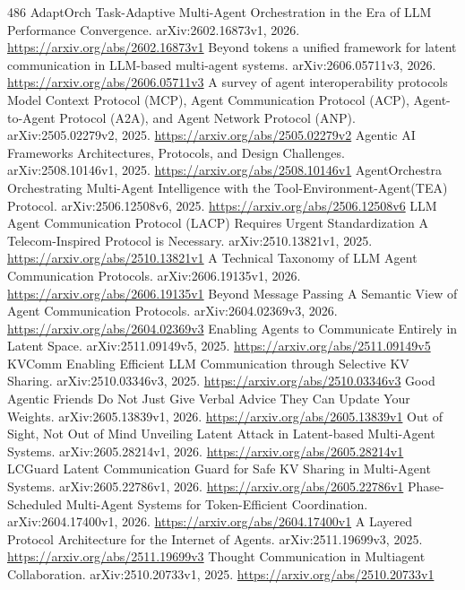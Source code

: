 \documentclass[11pt]{article}
\begin{document}
\begin{thebibliography}{486}
 AdaptOrch Task-Adaptive Multi-Agent Orchestration in the Era of LLM Performance Convergence. arXiv:2602.16873v1, 2026. \url{https://arxiv.org/abs/2602.16873v1}
 Beyond tokens a unified framework for latent communication in LLM-based multi-agent systems. arXiv:2606.05711v3, 2026. \url{https://arxiv.org/abs/2606.05711v3}
 A survey of agent interoperability protocols Model Context Protocol (MCP), Agent Communication Protocol (ACP), Agent-to-Agent Protocol (A2A), and Agent Network Protocol (ANP). arXiv:2505.02279v2, 2025. \url{https://arxiv.org/abs/2505.02279v2}
 Agentic AI Frameworks Architectures, Protocols, and Design Challenges. arXiv:2508.10146v1, 2025. \url{https://arxiv.org/abs/2508.10146v1}
 AgentOrchestra Orchestrating Multi-Agent Intelligence with the Tool-Environment-Agent(TEA) Protocol. arXiv:2506.12508v6, 2025. \url{https://arxiv.org/abs/2506.12508v6}
 LLM Agent Communication Protocol (LACP) Requires Urgent Standardization A Telecom-Inspired Protocol is Necessary. arXiv:2510.13821v1, 2025. \url{https://arxiv.org/abs/2510.13821v1}
 A Technical Taxonomy of LLM Agent Communication Protocols. arXiv:2606.19135v1, 2026. \url{https://arxiv.org/abs/2606.19135v1}
 Beyond Message Passing A Semantic View of Agent Communication Protocols. arXiv:2604.02369v3, 2026. \url{https://arxiv.org/abs/2604.02369v3}
 Enabling Agents to Communicate Entirely in Latent Space. arXiv:2511.09149v5, 2025. \url{https://arxiv.org/abs/2511.09149v5}
 KVComm Enabling Efficient LLM Communication through Selective KV Sharing. arXiv:2510.03346v3, 2025. \url{https://arxiv.org/abs/2510.03346v3}
 Good Agentic Friends Do Not Just Give Verbal Advice They Can Update Your Weights. arXiv:2605.13839v1, 2026. \url{https://arxiv.org/abs/2605.13839v1}
 Out of Sight, Not Out of Mind Unveiling Latent Attack in Latent-based Multi-Agent Systems. arXiv:2605.28214v1, 2026. \url{https://arxiv.org/abs/2605.28214v1}
 LCGuard Latent Communication Guard for Safe KV Sharing in Multi-Agent Systems. arXiv:2605.22786v1, 2026. \url{https://arxiv.org/abs/2605.22786v1}
 Phase-Scheduled Multi-Agent Systems for Token-Efficient Coordination. arXiv:2604.17400v1, 2026. \url{https://arxiv.org/abs/2604.17400v1}
 A Layered Protocol Architecture for the Internet of Agents. arXiv:2511.19699v3, 2025. \url{https://arxiv.org/abs/2511.19699v3}
 Thought Communication in Multiagent Collaboration. arXiv:2510.20733v1, 2025. \url{https://arxiv.org/abs/2510.20733v1}

\end{thebibliography}
\end{document}
